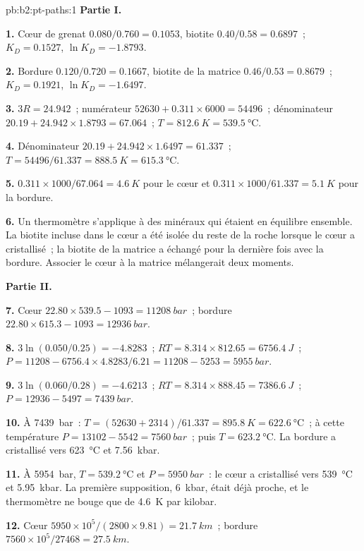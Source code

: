 \begin{solution}{pb:b2:pt-paths:1}
\noindent\textbf{Partie I.}

\textbf{1.} Cœur de grenat $0.080/0.760 = 0.1053$, biotite $0.40/0.58 = 0.6897$~; $K_D =
0.1527$, $\ln K_D = -1.8793$.

\textbf{2.} Bordure $0.120/0.720 = 0.1667$, biotite de la matrice $0.46/0.53 = 0.8679$~; $K_D =
0.1921$, $\ln K_D = -1.6497$.

\textbf{3.} $3R = 24.942$~; numérateur $52630 + 0.311\times6000 = 54496$~; dénominateur $20.19
+ 24.942\times1.8793 = 67.064$~; $T = \qty{812.6}{K} = \qty{539.5}{\celsius}$.

\textbf{4.} Dénominateur $20.19 + 24.942\times1.6497 = 61.337$~; $T = 54496/61.337 =
\qty{888.5}{K} = \qty{615.3}{\celsius}$.

\textbf{5.} $0.311\times1000/67.064 = \qty{4.6}{K}$ pour le cœur et $0.311\times1000/61.337
= \qty{5.1}{K}$ pour la bordure.

\textbf{6.} Un thermomètre s'applique à des minéraux qui étaient en équilibre ensemble. La
biotite incluse dans le cœur a été isolée du reste de la roche lorsque le cœur a cristallisé~;
la biotite de la matrice a échangé pour la dernière fois avec la bordure. Associer le cœur à la matrice mélangerait
deux moments.

\noindent\textbf{Partie II.}

\textbf{7.} Cœur $22.80\times539.5 - 1093 = \qty{11208}{bar}$~; bordure $22.80\times615.3 -
1093 = \qty{12936}{bar}$.

\textbf{8.} $3\ln(0.050/0.25) = -4.8283$~; $RT = 8.314\times812.65 = \qty{6756.4}{J}$~; $P =
11208 - 6756.4\times4.8283/6.21 = 11208 - 5253 = \qty{5955}{bar}$.

\textbf{9.} $3\ln(0.060/0.28) = -4.6213$~; $RT = 8.314\times888.45 = \qty{7386.6}{J}$~; $P
= 12936 - 5497 = \qty{7439}{bar}$.

\textbf{10.} À \qty{7439}{bar}~: $T = (52630 + 2314)/61.337 = \qty{895.8}{K} =
\qty{622.6}{\celsius}$~; à cette température $P = 13102 - 5542 = \qty{7560}{bar}$~; puis $T
= \qty{623.2}{\celsius}$. La bordure a cristallisé vers \qty{623}{\celsius} et \qty{7.56}{kbar}.

\textbf{11.} À \qty{5954}{bar}, $T = \qty{539.2}{\celsius}$ et $P = \qty{5950}{bar}$~: le
cœur a cristallisé vers \qty{539}{\celsius} et \qty{5.95}{kbar}. La première supposition,
\qty{6}{kbar}, était déjà proche, et le thermomètre ne bouge que de \qty{4.6}{K} par kilobar.

\textbf{12.} Cœur $5950\times10^5/(2800\times9.81) = \qty{21.7}{km}$~; bordure
$7560\times10^5/27468 = \qty{27.5}{km}$.


\end{solution}
